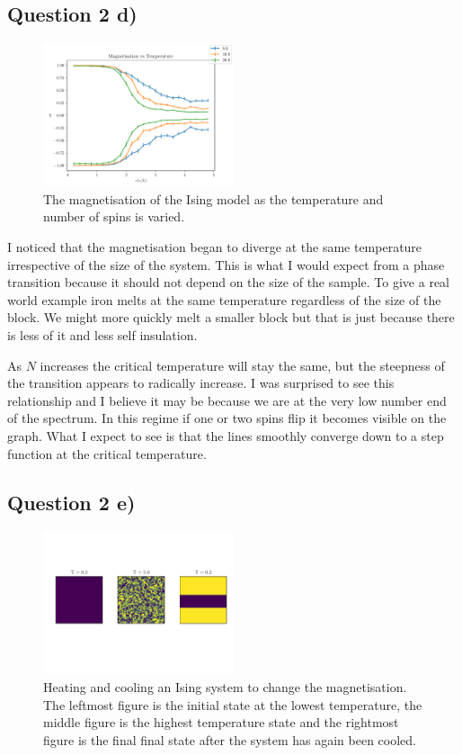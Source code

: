 \documentclass[a4paper, twocolumn]{article}
\begin{document}
\subsection*{Question 2 d)}
\begin{figure}
    \centering
    \includegraphics[width=0.5\textwidth]{pub/figures/magnetisation_ising_2d.pdf}
    \caption{The magnetisation of the Ising model as the %
        temperature and number of spins is varied.}
    \label{fig:8}
\end{figure}


I noticed that the magnetisation began to diverge at the same %
temperature irrespective of the size of the system. This is what %
I would expect from a phase transition because it should not depend %
on the size of the sample. To give a real world example iron melts %
at the same temperature regardless of the size of the block. %
We might more quickly melt a smaller block but that is just because %
there is less of it and less self insulation. 


As \(N\) increases the critical temperature will stay the same, %
but the steepness of the transition appears to radically increase. %
I was surprised to see this relationship and I believe it may %
be because we are at the very low number end of the spectrum. %
In this regime if one or two spins flip it becomes visible on %
the graph. What I expect to see is that the lines smoothly %
converge down to a step function at the critical temperature. 


\subsection*{Question 2 e)}
\begin{figure}
    \centering
    \includegraphics[width=0.5\textwidth]{pub/figures/heating_and_cooling_ising_2d.pdf}
    \caption{Heating and cooling an Ising system to change the %
        magnetisation. The leftmost figure is the initial state %
        at the lowest temperature, the middle figure is the highest %
        temperature state and the rightmost figure is the final %
        final state after the system has again been cooled.}
    \label{fig:9}
\end{figure}
\end{document}
